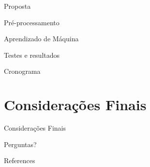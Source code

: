 \documentclass[10pt]{beamer}
\begin{document}
\begin{frame}{Proposta}
    
\end{frame}

\begin{frame}{Pré-processamento}
    
\end{frame}

\begin{frame}{Aprendizado de Máquina}
    
\end{frame}

\begin{frame}{Testes e resultados}
    
\end{frame}

\begin{frame}{Cronograma}
    
\end{frame}

\section{Considerações Finais}

\begin{frame}{Considerações Finais}
    
\end{frame}

{
\begin{frame}[standout]
  Perguntas?
\end{frame}
}

\appendix


\begin{frame}[allowframebreaks]{References}

  
  

\end{frame}
\end{document}

